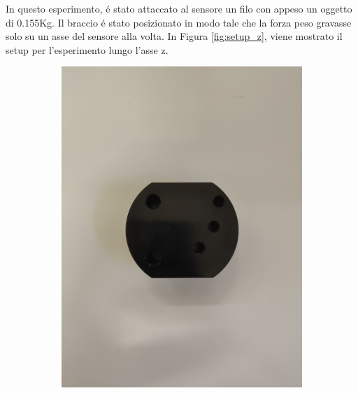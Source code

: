 In questo esperimento, \'{e} stato attaccato al sensore un filo con appeso un oggetto di 0.155Kg. 
Il braccio \'{e} stato posizionato in modo tale che la forza peso gravasse solo su un asse del sensore alla volta. 
In Figura \ref{fig:setup_z}, viene mostrato il setup per l'esperimento lungo l'asse z. 
\begin{figure}[H]
    \centering
    \begin{subfigure}[b]{0.4\textwidth}
        \includegraphics[width=\textwidth]{images/object.jpg}
        \label{fig:object}
    \end{subfigure}
    \qquad
    \begin{subfigure}[b]{0.4\textwidth}

\end{subfigure}
\end{figure}
